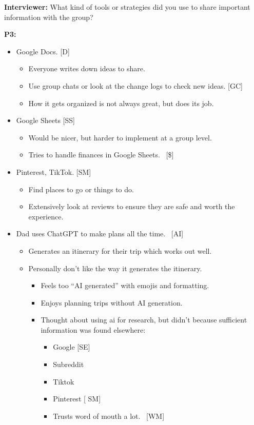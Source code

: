 \documentclass[12pt,a4paper]{article}
\begin{document}
\textbf{Interviewer: }What kind of tools or strategies did you use to share important information with the group?  

\textbf{P3: }

\begin{itemize}
    \item Google Docs. [D]
    \begin{itemize}
        \item Everyone writes down ideas to share.
        \item Use group chats or look at the change logs to check new ideas. [GC]
        \item How it gets organized is not always great, but does its job.
    \end{itemize}
    \item Google Sheets [SS]
    \begin{itemize}
        \item Would be nicer, but harder to implement at a group level. 
        \item Tries to handle finances in Google Sheets.  [\$]
    \end{itemize}
    \item Pinterest, TikTok. [SM]
    \begin{itemize}
        \item Find places to go or things to do. 
        \item Extensively look at reviews to ensure they are safe and worth the experience. 
    \end{itemize}
    \item Dad uses ChatGPT to make plans all the time.  [AI]
    \begin{itemize}
        \item Generates an itinerary for their trip which works out well. 
        \item Personally don’t like the way it generates the itinerary.
        \begin{itemize}
            \item Feels too “AI generated” with emojis and formatting. 
            \item Enjoys planning trips without AI generation. 
            \item Thought about using ai for research, but didn’t because sufficient information was found elsewhere: 
            \begin{itemize}
                \item Google [SE]
                \item Subreddit
                \item Tiktok
                \item Pinterest [ SM]
                \item Trusts word of mouth a lot.  [WM]
            \end{itemize}
        \end{itemize}
    \end{itemize}
\end{itemize}
\end{document}
